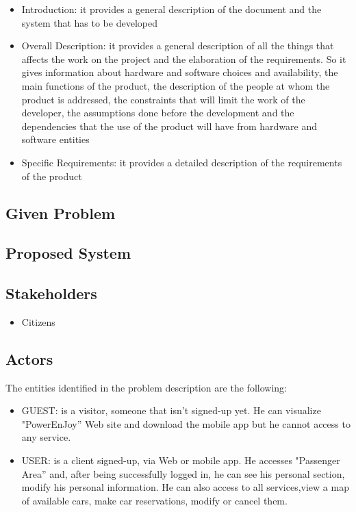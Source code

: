 \begin{itemize}
	\item Introduction: it provides a general description of the document and the system that has to be developed
	\item Overall Description: it provides a general description of all the things that  affects the work on the project and the elaboration of the requirements. So it gives information about hardware and software choices and availability, the main functions of the product, the description of the people at whom the product is addressed, the constraints that will limit the work of the developer, the assumptions done before the development and the dependencies that the use of the product will have from hardware and software entities
	\item Specific Requirements: it provides a detailed description of the requirements of the product
\end{itemize}


\subsection{Given Problem}

\subsection{Proposed System}


\subsection{Stakeholders}
\begin{itemize}
	\item Citizens
	
	
\end{itemize}



\subsection{Actors}
The entities identified in the problem description are the following: 
\begin{itemize}
	\item GUEST: is a visitor, someone that isn't signed-up yet. He can visualize
	"PowerEnJoy'' Web site and download the mobile app but he cannot
	access to any service.
	\item USER: is a client signed-up, via Web or mobile app. He accesses
	"Passenger Area'' and, after being successfully logged in, he can see
	his personal section, modify his personal information. He can also
	access to all services,view a map of available cars, make car reservations, modify or
	cancel them.
\end{itemize}

